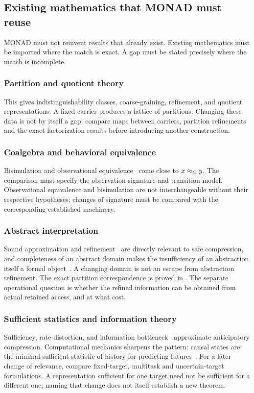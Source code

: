 \subsection{Existing mathematics that MONAD must reuse}

MONAD must not reinvent results that already exist. Existing
mathematics must be imported where the match is exact. A gap must be
stated precisely where the match is incomplete.

\subsubsection{Partition and quotient theory}
This gives indistinguishability classes, coarse-graining, refinement,
and quotient representations. A fixed carrier produces a lattice of
partitions. Changing these data is not by itself a gap: compare maps
between carriers, partition refinements and the exact factorization
results before introducing another construction.

\subsubsection{Coalgebra and behavioral equivalence}\label{sss:coalgebra}
Bisimulation and observational
equivalence~\cite{rutten2000universal,jacobs2016introduction} come
close to $x \approx_{C} y$. The comparison must specify the observation
signature and transition model. Observational equivalence and bisimulation
are not interchangeable without their respective hypotheses; changes of
signature must be compared with the corresponding established machinery.

\subsubsection{Abstract interpretation}\label{sss:abstract-interpretation}
Sound approximation and refinement~\cite{cousot1977abstract} are
directly relevant to safe compression, and completeness of an
abstract domain makes the insufficiency of an abstraction itself a
formal object~\cite{giacobazzi2000making}. A changing domain is not
an escape from abstraction refinement. The exact partition correspondence
is proved in .
The separate operational question is whether the refined information can
be obtained from actual retained access, and at what cost.

\subsubsection{Sufficient statistics and information theory}
Sufficiency, rate-distortion, and information
bottleneck~\cite{cover2006elements,shannon1959coding,tishby1999information}
approximate anticipatory compression. Computational mechanics
sharpens the pattern: causal states are the minimal sufficient
statistic of history for predicting
futures~\cite{shalizi2001computational}. For a later change of relevance,
compare fixed-target, multitask and uncertain-target formulations. A
representation sufficient for one target need not be sufficient for a
different one; naming that change does not itself establish a new theorem.

